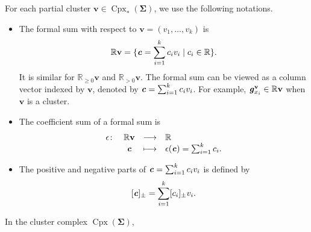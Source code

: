 \documentclass[11pt,reqno]{amsart}
\theoremstyle{plain}
\theoremstyle{definition}
\numberwithin{equation}{section}
\newcommand\RR{\mathbb{R}}
\newcommand\<{\langle}
\renewcommand\>{\rangle}
\newcommand{\on}[1]{\operatorname{#1}}
\def\CCx{\on{Cpx}}   %
\def\vv{\mathbf{v}}
\newcommand{\bfit}[1]{\textbf{\textit{#1}}}
\def\seeds{\mathbf{\Sigma}}
\def\cvec{\bfit{c}}
\def\gvec{\bfit{g}}
\def\csum{\epsilon}
\begin{document}
For each partial cluster $\vv\in\CCx_*(\seeds)$, we use the following notations.
\begin{itemize}
    \item The formal sum with respect to $\vv=(v_1,\ldots,v_k)$ is 
    \begin{gather}
        \RR\vv=\{   \cvec=\sum_{i=1}^k c_i v_i    \mid    c_i\in\RR\}.
    \end{gather}
    It is similar for $\RR_{\ge0}\vv$ and $\RR_{>0}\vv$.
    The formal sum can be viewed as a column vector indexed by $\vv$, denoted by $\cvec=\sum_{i=1}^k c_i v_i$.
    For example, $\gvec^\vv_{x_i}\in\RR\vv$ when $\vv$ is a cluster.
    
    
    \item The coefficient sum of a formal sum is 
    \begin{equation}\label{eq:csum}
    \begin{array}{rccl}
      \csum\colon
    & \RR\vv & \longrightarrow & \RR  \\
    & \cvec & \longmapsto & \csum(\cvec)=\sum_{i=1}^k c_i.
    \end{array}
    \end{equation}

    \item The positive and negative parts of $\cvec=\sum_{i=1}^k c_i v_i$ is defined by
    \begin{gather}\label{eq:pmvec}
        [\cvec]_\pm=\sum_{i=1}^k [c_i]_\pm v_i.
    \end{gather}
\end{itemize}
In the cluster complex $\CCx(\seeds)$,
\end{document}
